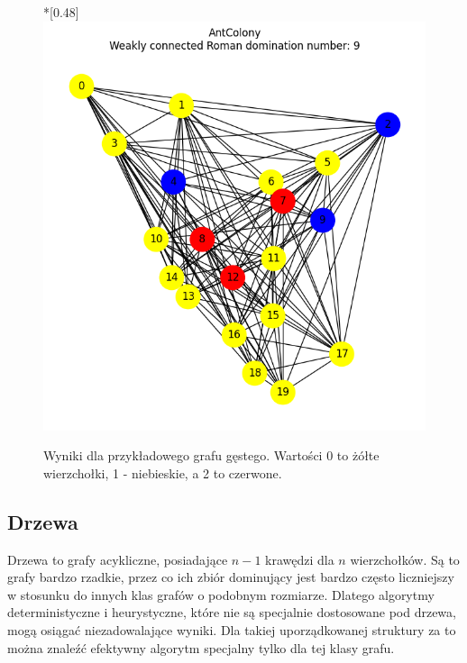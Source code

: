 \begin{figure}[H]
        \hfill
        \begin{subcaptionbox}*{}[0.48\linewidth]
            {\includegraphics[width=0.75\linewidth]{assets/plots/AntColony/ErdosRenyi_dense_n20_i2_results.png}}
        \end{subcaptionbox}
    
        \caption{Wyniki dla przykładowego grafu gęstego. Wartości 0 to żółte wierzchołki, 1 - niebieskie, a 2 to czerwone.}
        \label{fig:dense}
    \end{figure}

\subsection{Drzewa}

Drzewa to grafy acykliczne, posiadające $n-1$ krawędzi dla $n$ wierzchołków. Są to grafy bardzo rzadkie, przez co ich zbiór dominujący jest bardzo często liczniejszy w stosunku do innych klas grafów o podobnym rozmiarze. Dlatego algorytmy deterministyczne i heurystyczne, które nie są specjalnie dostosowane pod drzewa, mogą osiągać niezadowalające wyniki. Dla takiej uporządkowanej struktury za to można znaleźć efektywny algorytm specjalny tylko dla tej klasy grafu.

